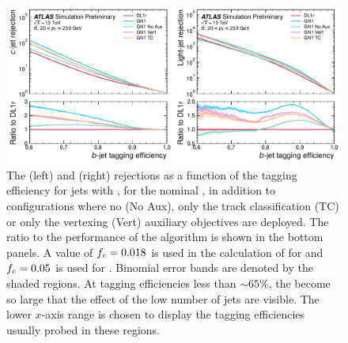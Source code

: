 \begin{figure}[!p]
    \centering
    \includegraphics[width=\textwidth]{chapters/gnn_tagger/figs/results/ablations/ttbar/ttbar_roc_btag.pdf}
    \caption{The \cjet (left) and \ljet (right) rejections as a function of the \bjet tagging efficiency for \ttbar jets with \ttbarpt, for the nominal \GNN, in addition to configurations where no (\GNN No Aux), only the track classification (\GNN TC) or only the vertexing (\GNN Vert) auxiliary objectives are deployed. The ratio to the performance of the \DLr algorithm is shown in the bottom panels. A value of $f_c = 0.018$ is used in the calculation of \Db for \DLr and $f_c = 0.05$ is used for \GNN. Binomial error bands are denoted by the shaded regions. At \bjet tagging efficiencies less than $\sim65\%$, the \lrej become so large that the effect of the low number of jets are visible. The lower $x$-axis range is chosen to display the \bjet tagging efficiencies usually probed in these regions.}
    \label{fig:ttbar_btag_roc_ab}
\end{figure}

